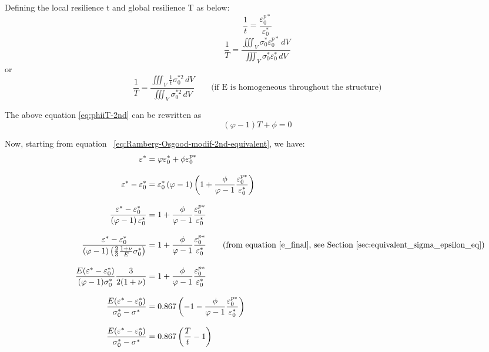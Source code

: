 \documentclass[10pt,a4paper]{article}
\begin{document}
Defining the local resilience t and global resilience T as below:
\begin{equation*} 
\frac{1}{t}= \frac{ \varepsilon_0^{p*}}{ \varepsilon_0^*}
\end{equation*} 
\begin{equation*} 
\frac{1}{T}= \frac{ \iiint_V \sigma_0^* \varepsilon_0^{p*} \, dV }{ \iiint_V \sigma_0^* \varepsilon_0^* \, dV }
\end{equation*} 
or
\begin{equation*} 
\frac{1}{T}=\frac{ \iiint_V \frac{1}{t} \sigma_0^{*2} \, dV }{ \iiint_V \sigma_0^{*2}  \, dV }    \ \ \ \ \ \ \ \ \ \text{(if E is homogeneous throughout the structure)}
\end{equation*} 


The above equation \eqref{eq:phiiT-2nd} can be rewritten as 
\begin{equation}\left( \varphi-1 \right)T+\phi=0
\label{eq:LaRoche4} 
\end{equation}


Now, starting from equation ~\eqref{eq:Ramberg-Osgood-modif-2nd-equivalent}, we have:
\begin{align} 
\varepsilon^* &= \varphi \varepsilon_0^* + \phi \varepsilon_0^{p*}  \notag \\[3mm]
\varepsilon^* - \varepsilon_0^* &=\varepsilon_0^*  \left(\varphi-1 \right) \left(1+\frac{\phi}{\varphi-1}\frac{\varepsilon_0^{p*}}{\varepsilon_0^*}\right) \notag \\[3mm]
\frac{\varepsilon^*-\varepsilon_0^*}{ \left(\varphi-1 \right)\varepsilon_0^*} &= 1+\frac{\phi}{\varphi-1}\frac{\varepsilon_0^{p*}}{\varepsilon_0^*} \notag \\[3mm]
\ \ \ \ \ \ \ \ \ \ \ \ \ \ \ \ \ \ \ \frac{\varepsilon^*-\varepsilon_0^*} { (\varphi-1) \left( \frac{2}{3}\frac{1+\nu}{E}  \sigma_0^* \right) }  &= 1+\frac{\phi}{\varphi-1}\frac{\varepsilon_0^{p*}}{\varepsilon_0^*} \notag  \qquad \text{(from equation \eqref{e_final}, see Section \ref{sec:equivalent_sigma_epsilon_eq})} \notag \\[3mm]
\frac{E(\varepsilon^*-\varepsilon_0^*)} { (\varphi-1) \sigma_0^*} \frac{3}{2(1+\nu)} &= 1 +\frac{\phi}{\varphi-1}\frac{\varepsilon_0^{p*}}{\varepsilon_0^*}  \notag  \\[3mm]
\frac{E(\varepsilon^*-\varepsilon_0^*)} {\sigma_0^*-\sigma^*} &=0.867 \left( -1-\frac{\phi}{\varphi-1}\frac{\varepsilon_0^{p*}}{\varepsilon_0^*} \right) \notag \\[3mm]
\frac{E(\varepsilon^*-\varepsilon_0^*)} {\sigma_0^*-\sigma^*} &=  0.867 \left( \frac{T}{t} -1      \right)
\end{align}
\end{document}
